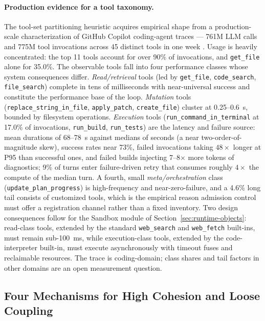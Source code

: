 \paragraph{Production evidence for a tool taxonomy.}
The tool-set partitioning heuristic acquires empirical shape from a production-scale characterization of GitHub Copilot coding-agent traces --- 761M LLM calls and 775M tool invocations across 45 distinct tools in one week \cite{agenticcoding2026wild}. Usage is heavily concentrated: the top 11 tools account for over 90\% of invocations, and \texttt{get\_file} alone for 35.0\%. The observable tools fall into four performance classes whose system consequences differ. \textit{Read/retrieval} tools (led by \texttt{get\_file}, \texttt{code\_search}, \texttt{file\_search}) complete in tens of milliseconds with near-universal success and constitute the performance base of the loop. \textit{Mutation} tools (\texttt{replace\_string\_in\_file}, \texttt{apply\_patch}, \texttt{create\_file}) cluster at 0.25--0.6~s, bounded by filesystem operations. \textit{Execution} tools (\texttt{run\_command\_in\_terminal} at 17.0\% of invocations, \texttt{run\_build}, \texttt{run\_tests}) are the latency and failure source: mean durations of 68--78~s against medians of seconds (a near two-order-of-magnitude skew), success rates near 73\%, failed invocations taking $48\times$ longer at P95 than successful ones, and failed builds injecting 7--8$\times$ more tokens of diagnostics; 9\% of turns enter failure-driven retry that consumes roughly $4\times$ the compute of the median turn. A fourth, small \textit{meta/orchestration} class (\texttt{update\_plan\_progress}) is high-frequency and near-zero-failure, and a 4.6\% long tail consists of customized tools, which is the empirical reason admission control must offer a registration channel rather than a fixed inventory. Two design consequences follow for the Sandbox module of Section~\ref{sec:runtime-objects}: read-class tools, extended by the standard \texttt{web\_search} and \texttt{web\_fetch} built-ins, must remain sub-100~ms, while execution-class tools, extended by the code-interpreter built-in, must execute asynchronously with timeout fuses and reclaimable resources. The trace is coding-domain; class shares and tail factors in other domains are an open measurement question.

\subsection{Four Mechanisms for High Cohesion and Loose Coupling}

